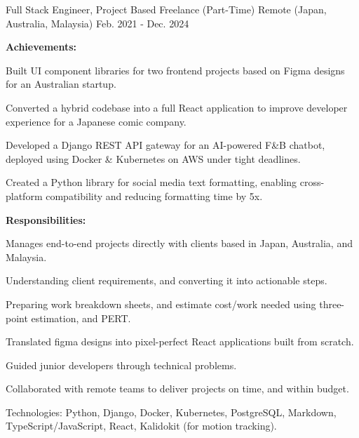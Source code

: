 

\begin{cventries}


  \cventry
    {Full Stack Engineer, Project Based} %
    {Freelance (Part-Time)} %
    {Remote (Japan, Australia, Malaysia)} %
    {Feb. 2021 - Dec. 2024} %
    {
      \textbf{Achievements:}
      \vspace{1.5em}
      \begin{cvitems} %
        \item {Built UI component libraries for two frontend projects based on Figma designs for an Australian startup.}
        \item {Converted a hybrid codebase into a full React application to improve developer experience for a Japanese comic company.}
        \item {Developed a Django REST API gateway for an AI-powered F\&B chatbot, deployed using Docker \& Kubernetes on AWS under tight deadlines.}
        \item {Created a Python library for social media text formatting, enabling cross-platform compatibility and reducing formatting time by 5x.}
      \end{cvitems}
      \vspace{1.5em}
      \textbf{Responsibilities:}
      \vspace{1.5em}
      \begin{cvitems} %
        \item {Manages end-to-end projects directly with clients based in Japan, Australia, and Malaysia.}
        \item {Understanding client requirements, and converting it into actionable steps.}
        \item {Preparing work breakdown sheets, and estimate cost/work needed using three-point estimation, and PERT.}
        \item {Translated figma designs into pixel-perfect React applications built from scratch.}
        \item {Guided junior developers through technical problems.}
        \item {Collaborated with remote teams to deliver projects on time, and within budget.}
        \item {Technologies: Python, Django, Docker, Kubernetes, PostgreSQL, Markdown, TypeScript/JavaScript, React, Kalidokit (for motion tracking).}
      \end{cvitems}
    }


\end{cventries}
